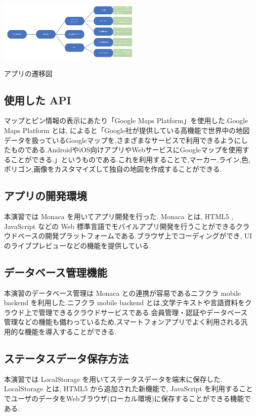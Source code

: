 \documentclass[a4paper, twoside]{jarticle}
\makeatletter
\newenvironment{figurehere}
  {\def\@captype{figure}}
  {}
\makeatother
\begin{document}
\begin{multicols}{2}
\begin{figurehere}
\begin{center}
\includegraphics[bb=30 10 700 370,width=7cm]{./image13.png}
\end{center}
\caption{アプリの遷移図}\label{fig:12}
\end{figurehere}

\subsection{使用した API}
マップとピン情報の表示にあたり「Google Maps Platform」を使用した.Google Maps Platform とは, \cite{api}によると「Google社が提供している高機能で世界中の地図データを扱っているGoogleマップを,さまざまなサービスで利用できるようにしたものである.AndroidやiOS向けアプリやWebサービスにGoogleマップを使用することができる.」というものである.これを利用することで,マーカー,ライン,色,ポリゴン,画像をカスタマイズして独自の地図を作成することができる.

\subsection{アプリの開発環境}
本演習では Monaca を用いてアプリ開発を行った. Monaca とは, HTML5 , JavaScript などの Web 標準言語でモバイルアプリ開発を行うことができるクラウドベースの開発プラットフォームである.ブラウザ上でコーディングができ, UI のライブプレビューなどの機能を提供している.

\subsection{データベース管理機能}
本演習のデータベース管理は Monaca との連携が容易であるニフクラ mobile backend を利用した.ニフクラ mobile backend とは,文学テキストや言語資料をクラウド上で管理できるクラウドサービスである.会員管理・認証やデータベース管理などの機能も備わっているため,スマートフォンアプリでよく利用される汎用的な機能を導入することができる.

\subsection{ステータスデータ保存方法}
本演習では LocalStorage を用いてステータスデータを端末に保存した. LocalStorage とは, HTML5 から追加された新機能で, JavaScript を利用することでユーザのデータをWebブラウザ(ローカル環境)に保存することができる機能である.


\end{multicols}
\end{document}
